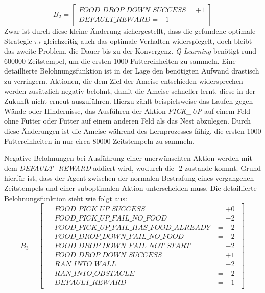 \begin{equation}
    B_{2} =  \begin{bmatrix} 
        FOOD\_DROP\_DOWN\_SUCCESS = +1\\
        DEFAULT\_REWARD = -1          
 \end{bmatrix}
\end{equation}
Zwar ist durch diese kleine Änderung sichergestellt, dass die gefundene optimale Strategie $\pi_*$ gleichzeitig auch das optimale Verhalten widerspiegelt, doch bleibt das zweite Problem, die Dauer bis zu der Konvergenz. \textit{Q-Learning} benötigt rund $600000$ Zeitstempel, um die ersten 1000 Futtereinheiten zu sammeln. Eine detaillierte Belohnungsfunktion ist in der Lage den benötigten Aufwand drastisch zu verringern. Aktionen, die dem Ziel der Ameise entschieden widersprechen werden zusätzlich negativ belohnt, damit die Ameise schneller lernt, diese in der Zukunft nicht erneut auszuführen. Hierzu zählt beispielsweise das Laufen gegen Wände oder Hindernisse, das Ausführen der Aktion \textit{PICK\_UP} auf einem Feld ohne Futter oder Futter auf einem anderen Feld als das Nest abzulegen. Durch diese Änderungen ist die Ameise während des Lernprozesses fähig, die ersten 1000 Futtereinheiten in nur circa $80000$ Zeitstempeln zu sammeln. 
\par
Negative Belohnungen bei Ausführung einer unerwünschten Aktion werden mit dem \textit{DEFAULT\_REWARD} addiert wird, wodurch die -2 zustande kommt. Grund hierfür ist, dass der Agent zwischen der normalen \glqq Bestrafung\grqq{} eines vergangenen Zeitstempels und einer suboptimalen Aktion unterscheiden muss. Die detaillierte Belohnungsfunktion sieht wie folgt aus:
\begin{equation}
    B_{3} =  \begin{bmatrix} 
        \begin{aligned} 
        & FOOD\_PICK\_UP\_SUCCESS &= +0 \\
        & FOOD\_PICK\_UP\_FAIL\_NO\_FOOD &= -2 \\
        & FOOD\_PICK\_UP\_FAIL\_HAS\_FOOD\_ALREADY &= -2 \\
        & FOOD\_DROP\_DOWN\_FAIL\_NO\_FOOD &= -2 \\
        & FOOD\_DROP\_DOWN\_FAIL\_NOT\_START &= -2 \\
        & FOOD\_DROP\_DOWN\_SUCCESS &= +1 \\
        & RAN\_INTO\_WALL &= -2 \\
        & RAN\_INTO\_OBSTACLE &= -2 \\
        & DEFAULT\_REWARD &= -1 
    \end{aligned}                 
 \end{bmatrix}
\end{equation}